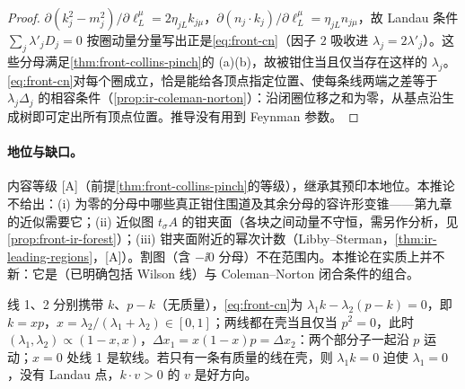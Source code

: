 \begin{proof}
$\partial(k_j^2-m_j^2)/\partial\ell_L^\mu=2\eta_{jL}k_{j\mu}$，$\partial(n_j\cdot k_j)/\partial\ell_L^\mu=\eta_{jL}n_{j\mu}$，故 Landau 条件 $\sum_j\lambda'_jD_j=0$ 按圈动量分量写出正是\cref{eq:front-cn}（因子 $2$ 吸收进 $\lambda_j=2\lambda'_j$）。这些分母满足\cref{thm:front-collins-pinch}的 (a)(b)，故被钳住当且仅当存在这样的 $\lambda_j$。\cref{eq:front-cn}对每个圈成立，恰是能给各顶点指定位置、使每条线两端之差等于 $\lambda_j\Delta_j$ 的相容条件（\cref{prop:ir-coleman-norton}）：沿闭圈位移之和为零，从基点沿生成树即可定出所有顶点位置。推导没有用到 Feynman 参数。
\end{proof}

\paragraph{地位与缺口。}内容等级 [A]（前提\cref{thm:front-collins-pinch}的等级），继承其预印本地位。本推论不给出：(i) 为零的分母中哪些真正钳住围道及其余分母的容许形变锥——第九章的近似需要它；(ii) 近似图 $t_\sigma A$ 的钳夹面（各块之间动量不守恒，需另作分析，见\cref{prop:front-ir-forest}）；(iii) 钳夹面附近的幂次计数（Libby--Sterman\cite{LibbySterman1978b}，\cref{thm:ir-leading-regions}，[A]）。割图（含 $-\ii0$ 分母）不在范围内。本推论在实质上并不新：它是\cite[定理~1]{Collins:2020euz}（已明确包括 Wilson 线）与 Coleman--Norton 闭合条件\cite{ColemanNorton1965}的组合。

\begin{example}[无质量自能的共线钳夹]\label{ex:front-collinear-pinch}
线 1、2 分别携带 $k$、$p-k$（无质量），\cref{eq:front-cn}为 $\lambda_1k-\lambda_2(p-k)=0$，即 $k=xp$，$x=\lambda_2/(\lambda_1+\lambda_2)\in[0,1]$；两线都在壳当且仅当 $p^2=0$，此时 $(\lambda_1,\lambda_2)\propto(1-x,x)$，$\Delta x_1=x(1-x)p=\Delta x_2$：两个部分子一起沿 $p$ 运动；$x=0$ 处线 1 是软线。若只有一条有质量的线在壳，则 $\lambda_1k=0$ 迫使 $\lambda_1=0$，没有 Landau 点，$k\cdot v>0$ 的 $v$ 是好方向。
\end{example}

